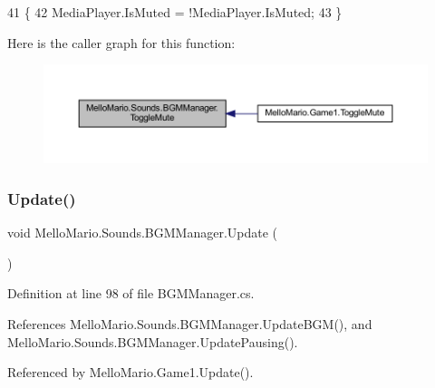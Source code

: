 \begin{DoxyCode}
41         \{
42             MediaPlayer.IsMuted = !MediaPlayer.IsMuted;
43         \}
\end{DoxyCode}
Here is the caller graph for this function\+:
\nopagebreak
\begin{figure}[H]
\begin{center}
\leavevmode
\includegraphics[width=350pt]{classMelloMario_1_1Sounds_1_1BGMManager_a03b0abc9778ec42b8ed717453f78b01a_icgraph}
\end{center}
\end{figure}
\mbox{\label{classMelloMario_1_1Sounds_1_1BGMManager_a0f3110164cefbd709684211ae151020e}} 
\subsubsection{Update()}
{\footnotesize\ttfamily void Mello\+Mario.\+Sounds.\+B\+G\+M\+Manager.\+Update (\begin{DoxyParamCaption}{ }\end{DoxyParamCaption})}



Definition at line 98 of file B\+G\+M\+Manager.\+cs.



References Mello\+Mario.\+Sounds.\+B\+G\+M\+Manager.\+Update\+B\+G\+M(), and Mello\+Mario.\+Sounds.\+B\+G\+M\+Manager.\+Update\+Pausing().



Referenced by Mello\+Mario.\+Game1.\+Update().


